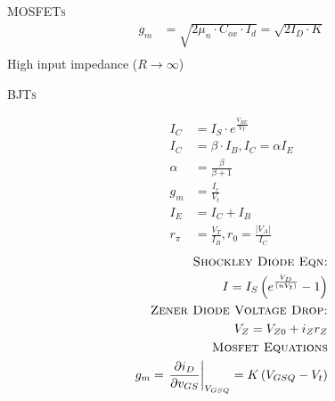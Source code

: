 \documentclass[10pt,letterpaper,english]{article}
\begin{document}
\textsc{MOSFETs}\\
\begin{align}
g_m& = \sqrt{2\mu_n \cdot C_{ox} \cdot I_d} = \sqrt{2I_D\cdot K}\\
\end{align}
High input impedance ($R\rightarrow \infty$)


\textsc{BJTs}\\
\begin{multicols}{2}
\begin{align*}
I_C&=I_S\cdot e^{\frac{V_{BE}}{V_T}}\nonumber\\
I_C&=\beta \cdot I_B, I_C = \alpha I_E\nonumber\\
\alpha&=\frac{\beta}{\beta + 1}\nonumber\\
g_m& = \frac{I_c}{V_t}\nonumber\\
I_E&= I_C + I_B\nonumber\\
r_\pi&= \frac{V_T}{I_B}, r_0 = \frac{|V_A|}{I_C}\nonumber
\end{align*}
\begin{align*}
\textsc{Shockley Diode Eqn:}\\
I= I_S\left(e^{\frac{V_D}{\left(nV_t\right)}} - 1\right)\nonumber\\
\textsc{Zener Diode Voltage Drop:}\\
V_{Z} = V_{Z0} + i_Zr_Z\nonumber\\
\textsc{Mosfet Equations}\\
g_m=\left.\frac{\partial i_D}{\partial v_{GS}} \right|_{V_{GSQ}} = K\left(V_{GSQ} - V_t\right)\nonumber\\
\end{align*}
\end{multicols}
\end{document}
